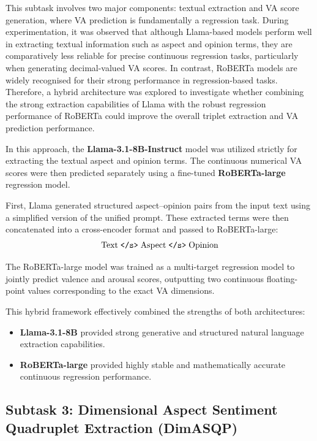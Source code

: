 \documentclass{article}
\begin{document}
This subtask involves two major components: textual extraction and VA score generation, where VA prediction is fundamentally a regression task. During experimentation, it was observed that although Llama-based models perform well in extracting textual information such as aspect and opinion terms, they are comparatively less reliable for precise continuous regression tasks, particularly when generating decimal-valued VA scores. In contrast, RoBERTa models are widely recognised for their strong performance in regression-based tasks. Therefore, a hybrid architecture was explored to investigate whether combining the strong extraction capabilities of Llama with the robust regression performance of RoBERTa could improve the overall triplet extraction and VA prediction performance.

In this approach, the \textbf{Llama-3.1-8B-Instruct} model was utilized strictly for extracting the textual aspect and opinion terms. The continuous numerical VA scores were then predicted separately using a fine-tuned \textbf{RoBERTa-large} regression model.

First, Llama generated structured aspect–opinion pairs from the input text using a simplified version of the unified prompt. These extracted terms were then concatenated into a cross-encoder format and passed to RoBERTa-large:
\begin{equation}
\text{Text} \; \text{\texttt{</s>}} \; \text{Aspect} \; \text{\texttt{</s>}} \; \text{Opinion}
\end{equation}

The RoBERTa-large model was trained as a multi-target regression model to jointly predict valence and arousal scores, outputting two continuous floating-point values corresponding to the exact VA dimensions.

This hybrid framework effectively combined the strengths of both architectures:
\begin{itemize}
    \item \textbf{Llama-3.1-8B} provided strong generative and structured natural language extraction capabilities.
    \item \textbf{RoBERTa-large} provided highly stable and mathematically accurate continuous regression performance.
\end{itemize}

\subsection{Subtask 3: Dimensional Aspect Sentiment Quadruplet Extraction (DimASQP)}
\end{document}
